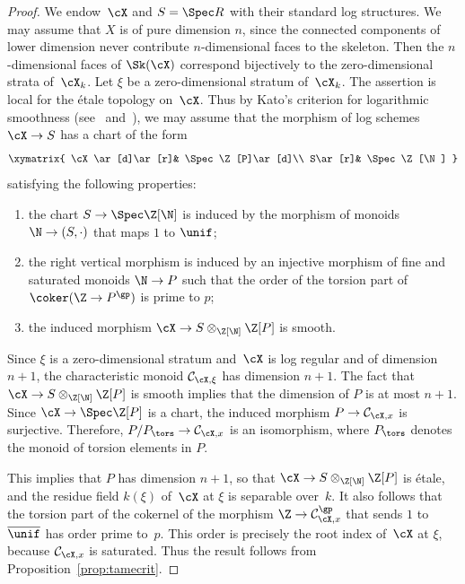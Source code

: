 \begin{proof}
We endow~$\cX$ and $S=\Spec R$ with their standard log structures. We may assume that
$X$ is of pure dimension $n$, since the connected components of lower dimension never contribute
$n$-dimensional faces to the skeleton.
Then the $n$-dimensional faces of $\Sk(\cX)$ correspond bijectively to the zero-dimensional strata of~$\cX_k$.
Let $\xi$ be a zero-dimensional stratum of~$\cX_k$.
The assertion is local for the étale topology on~$\cX$. Thus by Kato's criterion for logarithmic smoothness (see~\cite[3.5]{kato-log} and~\cite[4.1]{kato-def}),
we may assume that the morphism of log schemes $\cX\to S$ has a chart of the form
\[
\xymatrix{
\cX\ar[d]\ar[r]& \Spec \Z[P]\ar[d]\\
S\ar[r]& \Spec \Z[\N]
}
\]
satisfying the following properties:
\begin{enumerate}
\item the chart $S\to \Spec \Z[\N]$ is induced by the morphism of monoids $\N\to (S,\cdot)$ that maps $1$ to $\unif$;
\item the right vertical morphism is induced by an injective morphism of fine and saturated monoids $\N\to P$ such that the order of the torsion part of $\coker(\Z\to P^{\gp})$ is prime to $p$;
\item the induced morphism $\cX\to S\otimes_{\Z[\N]}\Z[P]$ is smooth.
\end{enumerate}
Since $\xi$ is a zero-dimensional stratum and~$\cX$ is log regular and of dimension $n+1$, the characteristic monoid
$\mathcal{C}_{\cX,\xi}$ has dimension $n+1$.
The fact that $\cX\to S\otimes_{\Z[\N]}\Z[P]$ is smooth implies that the dimension of $P$ is at most $n+1$.
Since $\cX\to \Spec \Z[P]$ is a chart, the induced morphism
$P\to \mathcal{C}_{\cX,x}$ is surjective.
Therefore, $P/P_{\tors}\to \mathcal{C}_{\cX,x}$ is an isomorphism, where $P_{\tors}$ denotes the monoid of torsion elements in $P$.

This implies that $P$ has dimension $n+1$, so that $\cX\to S\otimes_{\Z[\N]}\Z[P]$ is étale, and the residue field $k(\xi)$ of~$\cX$ at $\xi$ is separable over~$k$.
It also follows that the torsion part of the cokernel of the morphism
$\Z\to \mathcal{C}^{\gp}_{\cX,x}$ that sends $1$ to $\overline{\unif}$ has order prime to~$p$. This order is precisely the root index of~$\cX$ at $\xi$, because $\mathcal{C}_{\cX,x}$ is saturated. Thus the result follows from Proposition~\ref{prop:tamecrit}.
\end{proof}

